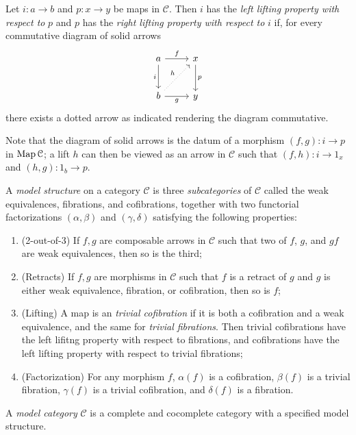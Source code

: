 \begin{definition}\label{1.1.3}
	Let $i : a \to b$ and $p : x \to y$ be maps in $\mathcal{C} $. Then $i$ has the \emph{left lifting property with respect to} $p$ and $p$ has the \emph{right lifting property with respect to} $i$ if, for every commutative diagram of solid arrows
	\[\begin{tikzcd}[row sep = 2.5em, column sep = 2.5em]
	a\ar[" f ", r] \ar[" i "', d]  & x\ar[" p ", d]  \\
	b \ar[" g "', r] \ar[" h ", dotted, ur]  & y
	\end{tikzcd}\]
	there exists a dotted arrow as indicated rendering the diagram commutative.
\end{definition}

\begin{remark}\label{1.1.4}
	Note that the diagram of solid arrows is the datum of a morphism $(f,g): i \to p$ in $\operatorname{Map} \mathcal{C} $; a lift $h$ can then be viewed as an arrow in $\mathcal{C} $ such that $(f,h): i \to 1_x$ and $(h,g): 1_b \to p$.
\end{remark}

\begin{definition}\label{1.1.5}
	A \emph{model structure} on a category $\mathcal{C} $ is three \emph{subcategories} of $\mathcal{C} $ called the weak equivalences, fibrations, and cofibrations, together with two functorial factorizations $(\alpha,\beta)$ and $(\gamma,\delta)$ satisfying the following properties:
	\begin{enumerate}
		\item (2-out-of-3) If $f,g$ are composable arrows in $\mathcal{C} $ such that two of $f$, $g$, and $gf$ are weak equivalences, then so is the third;
		\item (Retracts) If $f,g$ are morphisms in $\mathcal{C} $ such that $f$ is a retract of $g$ and $g$ is either weak equivalence, fibration, or cofibration, then so is $f$;
		\item (Lifting) A map is an \emph{trivial cofibration} if it is both a cofibration and a weak equivalence, and the same for \emph{trivial fibrations}. Then trivial cofibrations have the left lifitng property with respect to fibrations, and cofibrations have the left lifting property with respect to trivial fibrations;
		\item (Factorization) For any morphism $f$, $\alpha(f)$ is a cofibration, $\beta(f)$ is a trivial fibration, $\gamma(f)$ is a trivial cofibration, and $\delta(f)$ is a fibration.
	\end{enumerate}
\end{definition}
\begin{definition}\label{1.1.6}
	A \emph{model category} $\mathcal{C} $ is a complete and cocomplete category with a specified model structure.
\end{definition}

